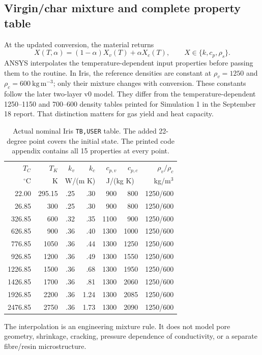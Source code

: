 \documentclass[oneside,openany]{amsdtx}
\begin{document}
\subsection{Virgin/char mixture and complete property table}
At the updated conversion, the material returns
\begin{equation}
 X(T,\alpha)=(1-\alpha)X_v(T)+\alpha X_c(T),\qquad X\in\{k,c_p,\rho_s\}.
\end{equation}
ANSYS interpolates the temperature-dependent input properties before passing them to the routine. In Iris, the reference densities are constant at $\rho_v=1250$ and $\rho_c=600\ \mathrm{kg\,m^{-3}}$; only their mixture changes with conversion. These constants follow the later two-layer v0 model. They differ from the temperature-dependent 1250--1150 and 700--600 density tables printed for Simulation 1 in the September 18 report. That distinction matters for gas yield and heat capacity.
\begin{table}[H]\centering\small
\begin{tabular}{rrrrrrr}\toprule
$T_C$ & $T_K$ & $k_v$ & $k_c$ & $c_{p,v}$ & $c_{p,c}$ & $\rho_v/\rho_c$\\
$^\circ$C & K & \multicolumn{2}{c}{W/(m K)} & \multicolumn{2}{c}{J/(kg K)} & kg/m$^3$\\\midrule
22.00 & 295.15 & .25 & .30 & 900 & 800 & 1250/600\\
26.85 & 300 & .25 & .30 & 900 & 800 & 1250/600\\
326.85 & 600 & .32 & .35 & 1100 & 900 & 1250/600\\
626.85 & 900 & .36 & .40 & 1300 & 1000 & 1250/600\\
776.85 & 1050 & .36 & .44 & 1300 & 1250 & 1250/600\\
926.85 & 1200 & .36 & .49 & 1300 & 1550 & 1250/600\\
1226.85 & 1500 & .36 & .68 & 1300 & 1950 & 1250/600\\
1426.85 & 1700 & .36 & .81 & 1300 & 2060 & 1250/600\\
1926.85 & 2200 & .36 & 1.24 & 1300 & 2085 & 1250/600\\
2476.85 & 2750 & .36 & 1.73 & 1300 & 2090 & 1250/600\\\bottomrule
\end{tabular}\caption{Actual nominal Iris \texttt{TB,USER} table. The added 22-degree point covers the initial state. The printed code appendix contains all 15 properties at every point.}\end{table}
The interpolation is an engineering mixture rule. It does not model pore geometry, shrinkage, cracking, pressure dependence of conductivity, or a separate fibre/resin microstructure.
\end{document}
